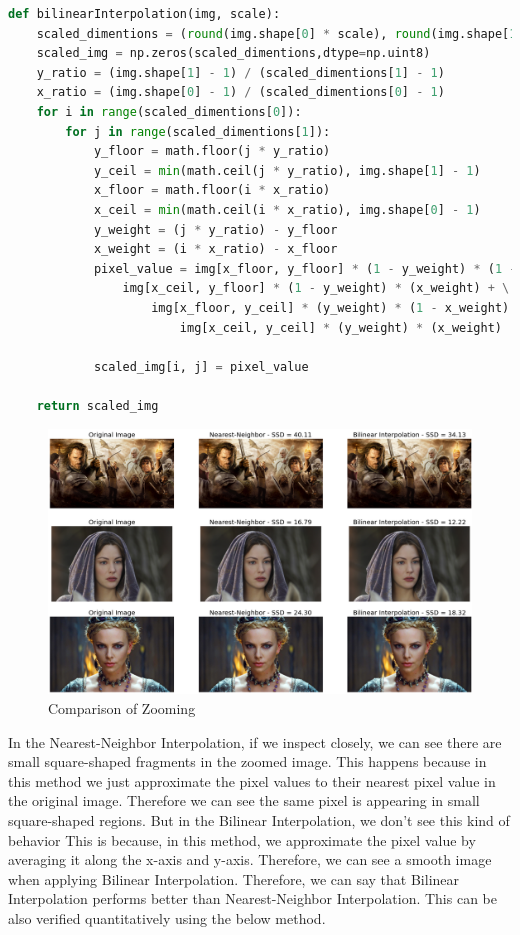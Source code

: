 \documentclass[a4paper]{article}
\begin{document}
\begin{lstlisting}[language=python, caption=Bi-linear Interpolation]
def bilinearInterpolation(img, scale):
    scaled_dimentions = (round(img.shape[0] * scale), round(img.shape[1] * scale), img.shape[2])
    scaled_img = np.zeros(scaled_dimentions,dtype=np.uint8)
    y_ratio = (img.shape[1] - 1) / (scaled_dimentions[1] - 1)
    x_ratio = (img.shape[0] - 1) / (scaled_dimentions[0] - 1)
    for i in range(scaled_dimentions[0]):
        for j in range(scaled_dimentions[1]):
            y_floor = math.floor(j * y_ratio)
            y_ceil = min(math.ceil(j * y_ratio), img.shape[1] - 1)
            x_floor = math.floor(i * x_ratio)
            x_ceil = min(math.ceil(i * x_ratio), img.shape[0] - 1)
            y_weight = (j * y_ratio) - y_floor
            x_weight = (i * x_ratio) - x_floor
            pixel_value = img[x_floor, y_floor] * (1 - y_weight) * (1 - x_weight) + \
                img[x_ceil, y_floor] * (1 - y_weight) * (x_weight) + \
                    img[x_floor, y_ceil] * (y_weight) * (1 - x_weight) + \
                        img[x_ceil, y_ceil] * (y_weight) * (x_weight)
            
            scaled_img[i, j] = pixel_value
            
    return scaled_img
\end{lstlisting}

\begin{figure}[!htb]
    \centering
    \includegraphics[width=\textwidth]{../q5.png}
    \caption{Comparison of Zooming}
    \label{figq5}
\end{figure}
In the Nearest-Neighbor Interpolation, if we inspect closely, we
 can see there are small square-shaped fragments in the zoomed image. This happens
  because in this method we just approximate the pixel values to
   their nearest pixel value in the original image. Therefore we
    can see the same pixel is appearing in small square-shaped regions.
     But in the Bilinear Interpolation, we don’t see this kind of behavior
      This is because, in this method, we approximate the pixel value
       by averaging it along the x-axis and y-axis. Therefore, we
        can see a smooth image when applying Bilinear Interpolation.
        Therefore, we can say that Bilinear Interpolation performs better
         than Nearest-Neighbor Interpolation. This can be also verified
          quantitatively using the below method.
\end{document}
